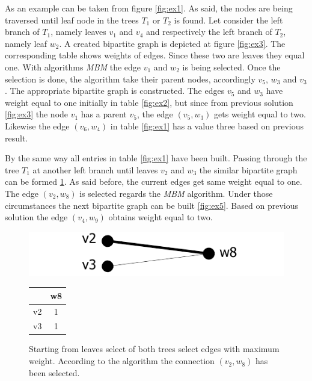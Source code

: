 \documentclass{report}
\begin{document}
As an example can be taken from figure \ref{fig:ex1}. As said, the nodes are being traversed until leaf node in the trees $ T_{1}$ or $ T_{2}$ is found. Let consider the left branch of $ T_{1}$, namely leaves $v_{1}$ and $v_{4}$ and respectively the left branch of $ T_{2}$, namely leaf $w_{2}$. A created bipartite graph is depicted at figure  \ref{fig:ex3}. The corresponding table shows weights of edges. Since these two are leaves they equal one. With algorithms \emph{MBM} the edge $v_{1}$ and $w_{2}$ is being selected. Once the selection is done, the algorithm take their parent nodes, accordingly $v_{5}$, $w_{3}$ and $v_{3}$. The appropriate bipartite graph is constructed. The edges  $v_{5}$ and $w_{3}$ have weight equal to one initially in table \ref{fig:ex2}, but since from previous solution \ref{fig:ex3}  the node $v_{1}$ has a parent $v_{5}$, the edge $(v_{5},w_{3})$ gets weight equal to two. Likewise the edge  $(v_{6},w_{4})$ in table \ref{fig:ex1} has a value three based on previous result.

By the same way all entries in table \ref{fig:ex1} have been built. Passing through the tree $ T_{1}$ at another left branch until leaves $v_{2}$ and $w_{3}$ the similar bipartite graph can be formed \ref{fig:ex6}. As said before, the current edges get same weight equal to one. The edge $(v_{2},w_{8})$ is selected regards the \emph{MBM} algorithm. Under those circumstances the next bipartite graph can be built \ref{fig:ex5}. Based on previous solution the edge $(v_{4},w_{9})$ obtains weight equal to two.

\begin{figure}[h]
  \begin{minipage}[h]{0.60\linewidth}
    \centering
    \includegraphics[scale=0.95]{Figures/algorithms/TD/6ex.pdf}\\[0.1cm]
  \end{minipage}%
  \begin{minipage}[b]{0.30\linewidth}
    \centering
\begin{tabular}{|c|c|}
\hline
   & w8 \\ \hline
v2 & \cellcolor[gray]{0.9} 1  \\ \hline
v3 & 1  \\ \hline
\end{tabular}
\end{minipage}
\caption[]{Starting from leaves select of both trees select edges with maximum weight. According to the algorithm the connection $(v_{2},w_{8})$ has been selected.}
\label{fig:ex6}
\end{figure}
\end{document}
